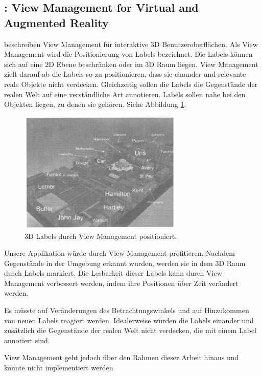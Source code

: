 \subsection{\cite{viewmanagement3d}: View Management for Virtual and Augmented Reality}

\cite{viewmanagement3d} beschreiben View Management für interaktive 3D Benutzeroberflächen. Als View Management wird die Positionierung von Labels bezeichnet.
Die Labels können sich auf eine 2D Ebene beschränken oder im 3D Raum liegen. View Management zielt darauf ab die Labels so zu positionieren, dass sie einander und relevante reale Objekte nicht verdecken. Gleichzeitig sollen die Labels die Gegenstände der realen Welt auf eine verständliche Art annotieren. Labels sollen nahe bei den Objekten liegen, zu denen sie gehören. Siehe Abbildung \ref{viewManagement}.

\begin{figure}[H]
	\centering
	\includegraphics[width=0.7\textwidth]{images/img_viewmanagement.PNG}
	\caption[View Management von \cite{viewmanagement3d}]{3D Labels durch View Management positioniert.\citep{viewmanagement3d}}
	\label{viewManagement}
\end{figure}

Unsere Applikation würde durch View Management profitieren. Nachdem Gegenstände in der Umgebung erkannt wurden, werden sie in dem 3D Raum durch Labels markiert. Die Lesbarkeit dieser Labels kann durch View Management verbessert werden, indem ihre Positionen über Zeit verändert werden. 

Es müsste auf Veränderungen des Betrachtungswinkels und auf Hinzukommen von neuen Labels reagiert werden. Idealerweise würden die Labels einander und zusätzlich die Gegenstände der realen Welt nicht verdecken, die mit einem Label annotiert sind. 

View Management geht jedoch über den Rahmen dieser Arbeit hinaus und konnte nicht implementiert werden. \citep{viewmanagement3d}


